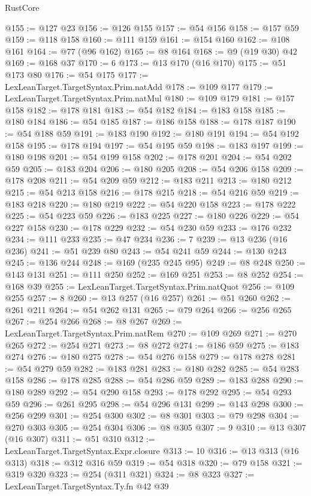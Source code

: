 \begin{lexlean}{RustCore}
\begin{coremodule}
@155 := @127 @23
@156 := @126 @155
@157 := @54 @156
@158 := @157 @59
@159 := @118 @158
@160 := @111 @159
@161 := @154 @160
@162 := @108 @161
@164 := @77 (@96 @162)
@165 := @8 @164
@168 := @9 (@19 @30) @42
@169 := @168 @37
@170 := 6
@173 := @13 @170 (@16 @170)
@175 := @51 @173 @80
@176 := @54 @175
@177 := LexLeanTarget.TargetSyntax.Prim.natAdd
@178 := @109 @177
@179 := LexLeanTarget.TargetSyntax.Prim.natMul
@180 := @109 @179
@181 := @157 @158
@182 := @178 @181
@183 := @54 @182
@184 := @183 @158
@185 := @180 @184
@186 := @54 @185
@187 := @186 @158
@188 := @178 @187
@190 := @54 @188 @59
@191 := @183 @190
@192 := @180 @191
@194 := @54 @192 @158
@195 := @178 @194
@197 := @54 @195 @59
@198 := @183 @197
@199 := @180 @198
@201 := @54 @199 @158
@202 := @178 @201
@204 := @54 @202 @59
@205 := @183 @204
@206 := @180 @205
@208 := @54 @206 @158
@209 := @178 @208
@211 := @54 @209 @59
@212 := @183 @211
@213 := @180 @212
@215 := @54 @213 @158
@216 := @178 @215
@218 := @54 @216 @59
@219 := @183 @218
@220 := @180 @219
@222 := @54 @220 @158
@223 := @178 @222
@225 := @54 @223 @59
@226 := @183 @225
@227 := @180 @226
@229 := @54 @227 @158
@230 := @178 @229
@232 := @54 @230 @59
@233 := @176 @232
@234 := @111 @233
@235 := @47 @234
@236 := 7
@239 := @13 @236 (@16 @236)
@241 := @51 @239 @80
@243 := @54 @241 @59
@244 := @130 @243
@245 := @136 @244
@248 := @169 (@235 @245 @95)
@249 := @8 @248
@250 := @143 @131
@251 := @111 @250
@252 := @169 @251
@253 := @8 @252
@254 := @168 @39
@255 := LexLeanTarget.TargetSyntax.Prim.natQuot
@256 := @109 @255
@257 := 8
@260 := @13 @257 (@16 @257)
@261 := @51 @260
@262 := @261 @211
@264 := @54 @262 @131
@265 := @79 @264
@266 := @256 @265
@267 := @254 @266
@268 := @8 @267
@269 := LexLeanTarget.TargetSyntax.Prim.natRem
@270 := @109 @269
@271 := @270 @265
@272 := @254 @271
@273 := @8 @272
@274 := @186 @59
@275 := @183 @274
@276 := @180 @275
@278 := @54 @276 @158
@279 := @178 @278
@281 := @54 @279 @59
@282 := @183 @281
@283 := @180 @282
@285 := @54 @283 @158
@286 := @178 @285
@288 := @54 @286 @59
@289 := @183 @288
@290 := @180 @289
@292 := @54 @290 @158
@293 := @178 @292
@295 := @54 @293 @59
@296 := @261 @295
@298 := @54 @296 @131
@299 := @143 @298
@300 := @256 @299
@301 := @254 @300
@302 := @8 @301
@303 := @79 @298
@304 := @270 @303
@305 := @254 @304
@306 := @8 @305
@307 := 9
@310 := @13 @307 (@16 @307)
@311 := @51 @310
@312 := LexLeanTarget.TargetSyntax.Expr.closure
@313 := 10
@316 := @13 @313 (@16 @313)
@318 := @312 @316 @59
@319 := @54 @318
@320 := @79 @158
@321 := @319 @320
@323 := @254 (@311 @321)
@324 := @8 @323
@327 := LexLeanTarget.TargetSyntax.Ty.fn @42 @39

\end{coremodule}
\end{lexlean}

